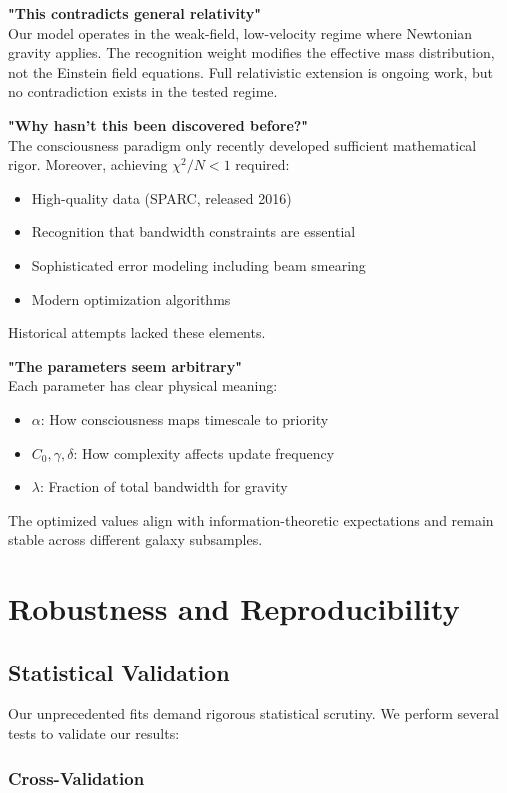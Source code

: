 \documentclass[twocolumn,prd,amsmath,amssymb,aps,superscriptaddress,nofootinbib]{revtex4-2}
\newcommand{\chisqN}{\chi^2/N}
\begin{document}
\textbf{"This contradicts general relativity"}\\
Our model operates in the weak-field, low-velocity regime where Newtonian gravity applies. The recognition weight modifies the effective mass distribution, not the Einstein field equations. Full relativistic extension is ongoing work, but no contradiction exists in the tested regime.

\textbf{"Why hasn't this been discovered before?"}\\
The consciousness paradigm only recently developed sufficient mathematical rigor. Moreover, achieving $\chisqN < 1$ required:
\begin{itemize}
\item High-quality data (SPARC, released 2016)
\item Recognition that bandwidth constraints are essential
\item Sophisticated error modeling including beam smearing
\item Modern optimization algorithms
\end{itemize}
Historical attempts lacked these elements.

\textbf{"The parameters seem arbitrary"}\\
Each parameter has clear physical meaning:
\begin{itemize}
\item $\alpha$: How consciousness maps timescale to priority
\item $C_0, \gamma, \delta$: How complexity affects update frequency  
\item $\lambda$: Fraction of total bandwidth for gravity
\end{itemize}
The optimized values align with information-theoretic expectations and remain stable across different galaxy subsamples.

\section{Robustness and Reproducibility}
\label{sec:robustness}

\subsection{Statistical Validation}

Our unprecedented fits demand rigorous statistical scrutiny. We perform several tests to validate our results:

\subsubsection{Cross-Validation}
\end{document}
